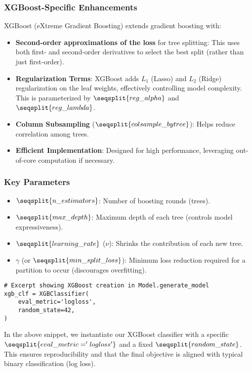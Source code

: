 \documentclass[12pt]{article}
\begin{document}
\subsubsection{XGBoost-Specific Enhancements}
XGBoost (eXtreme Gradient Boosting) extends gradient boosting with:
\begin{itemize}[noitemsep]
    \item \textbf{Second-order approximations of the loss} for tree splitting: This uses both first- and second-order derivatives to select the best split (rather than just first-order).
    \item \textbf{Regularization Terms}: XGBoost adds \(L_1\) (Lasso) and \(L_2\) (Ridge) regularization on the leaf weights, effectively controlling model complexity. This is parameterized by \(\seqsplit{reg\_alpha}\) and \(\seqsplit{reg\_lambda}\).
    \item \textbf{Column Subsampling} (\(\seqsplit{colsample\_bytree}\)): Helps reduce correlation among trees.
    \item \textbf{Efficient Implementation}: Designed for high performance, leveraging out-of-core computation if necessary.
\end{itemize}

\subsubsection{Key Parameters}
\begin{itemize}[noitemsep]
    \item \(\seqsplit{n\_estimators}\): Number of boosting rounds (trees).
    \item \(\seqsplit{max\_depth}\): Maximum depth of each tree (controls model expressiveness).
    \item \(\seqsplit{learning\_rate}\) (\(\nu\)): Shrinks the contribution of each new tree.
    \item \(\gamma\) (or \(\seqsplit{min\_split\_loss}\)): Minimum loss reduction required for a partition to occur (discourages overfitting).
\end{itemize}

\begin{verbatim}
# Excerpt showing XGBoost creation in Model.generate_model
xgb_clf = XGBClassifier(
    eval_metric='logloss',
    random_state=42,
)
\end{verbatim}

\noindent In the above snippet, we instantiate our XGBoost classifier with a specific \(\seqsplit{eval\_metric='logloss'}\) and a fixed \(\seqsplit{random\_state}\). This ensures reproducibility and that the final objective is aligned with typical binary classification (log loss).
\end{document}
